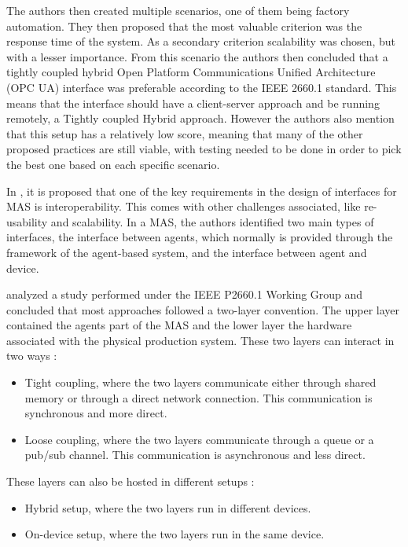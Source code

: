 The authors then created multiple scenarios, one of them being factory automation. They then proposed that the most valuable criterion was the response time of the system. As a secondary criterion scalability was chosen, but with a lesser importance. From this scenario the authors then concluded that a tightly coupled hybrid Open Platform Communications Unified Architecture (OPC UA) interface was preferable according to the IEEE 2660.1 standard. This means that the interface should have a client-server approach and be running remotely, a Tightly coupled Hybrid approach. However the authors also mention that this setup has a relatively low score, meaning that many of the other proposed practices are still viable, with testing needed to be done in order to pick the best one based on each specific scenario.


In \cite{Karnouskos2019}, it is proposed that one of the key requirements in the design of interfaces for MAS is interoperability. This comes with other challenges associated, like re-usability and scalability. In a MAS, the authors identified two main types of interfaces, the interface between agents, which normally is provided through the framework of the agent-based system, and the interface between agent and device. 


\citeauthor{8591641} \cite{8591641} analyzed a study performed under the IEEE P2660.1 Working Group \cite{9340089} and concluded that most approaches followed a two-layer convention. The upper layer contained the agents part of the MAS and the lower layer the hardware associated with the physical production system. These two layers can interact in two ways \cite{8591641}:
\begin{itemize}
	\item Tight coupling, where the two layers communicate either through shared memory or through a direct network connection. This communication is synchronous and more direct.
	\item Loose coupling, where the two layers communicate through a queue or a pub/sub channel. This communication is asynchronous and less direct.
\end{itemize}

These layers can also be hosted in different setups \cite{8591641}:
\begin{itemize}
	\item Hybrid setup, where the two layers run in different devices.
	\item On-device setup, where the two layers run in the same device. 
\end{itemize}

